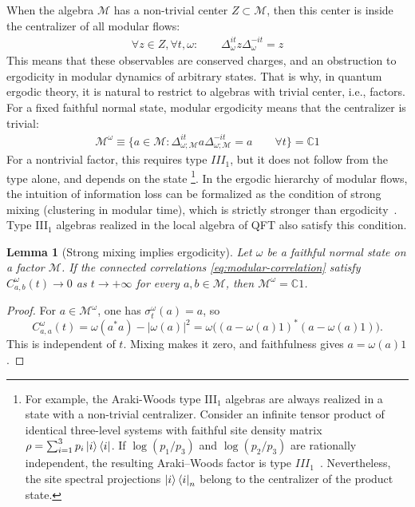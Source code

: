 \documentclass[a4paper,11pt]{article}
\newtheorem{lemma}[theorem]{Lemma}
\theoremstyle{definition}
\newcommand{\mM}{\mathcal{M}}
\begin{document}
When the algebra $\mM$ has a non-trivial center $Z\subset \mM$, then this center is inside the centralizer of all modular flows:
\begin{align}
    \forall z\in Z,\forall t,\omega:\qquad \Delta_{\omega}^{it}z \Delta_\omega^{-it}=z
\end{align}
This means that these observables are conserved charges, and an obstruction to ergodicity in modular dynamics of arbitrary states. That is why, in quantum ergodic theory, it is natural to restrict to algebras with trivial center, i.e., factors. For a fixed faithful normal state, modular ergodicity means that the centralizer is trivial:
\begin{align}
    \label{eq:modular-ergodicity}
    \mM^\omega\equiv \{a\in \mM:\Delta_{\omega;\mM}^{it}a\Delta_{\omega;\mM}^{-it}=a\qquad \forall t\}=\mathbb{C} 1
\end{align}
For a nontrivial factor, this requires type $III_1$, but it does not follow from the
type alone, and depends on the state \footnote{For example, the Araki-Woods type III$_1$ algebras are always realized in a state with a non-trivial centralizer. Consider an infinite tensor product of identical three-level
systems with faithful site density matrix
$\rho=\sum_{i=1}^3p_i\ket{i}\bra{i}$.
If $\log(p_1/p_3)$ and $\log(p_2/p_3)$ are rationally independent, the resulting
Araki--Woods factor is type $III_1$~\cite{ArakiWoods1968}.
Nevertheless, the site spectral projections $\ket{i}\bra{i}_n$ belong to the
centralizer of the product state.}. In the ergodic hierarchy of modular flows, the intuition of information loss can be formalized as the condition of strong mixing (clustering in modular time), which is strictly stronger than ergodicity~\cite{furuya2023information}. Type III$_1$ algebras realized in the local algebra of QFT also satisfy this condition.

\begin{lemma}[Strong mixing implies ergodicity]\label{lem:mixing-ergodic}
Let $\omega$ be a faithful normal state on a factor $\mM$. If the connected
correlations \eqref{eq:modular-correlation} satisfy
$C^\omega_{a,b}(t)\to0$ as $t\to+\infty$ for every $a,b\in\mM$, then
$\mM^\omega=\mathbb C1$.
\end{lemma}
\begin{proof}
For $a\in\mM^\omega$, one has $\sigma_t^\omega(a)=a$, so
\[
 C^\omega_{a,a}(t)
 =\omega(a^*a)-|\omega(a)|^2
 =\omega\bigl((a-\omega(a)1)^*(a-\omega(a)1)\bigr).
\]
This is independent of $t$. Mixing makes it zero, and faithfulness gives
$a=\omega(a)1$.
\end{proof}
\end{document}
